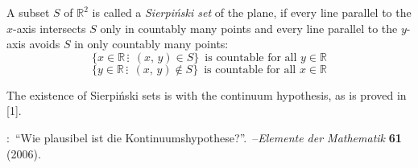 \documentclass[12pt]{article}
\theoremstyle{definition}
\begin{document}
A subset $S$ of $\mathbb{R}^2$ is called a \emph{Sierpi\'nski set} of the plane, if every line parallel to the $x$-axis intersects $S$ only in countably many points and every line parallel to the $y$-axis avoids $S$ in only countably many points:
$$\{x \in \mathbb{R}\,\vdots\;\, (x,\,y) \in S\} \,\mbox{ is countable for all }y \in \mathbb{R}$$
$$\{y \in \mathbb{R}\,\vdots\;\, (x,\,y) \notin S\} \,\mbox{ is countable for all }x \in \mathbb{R}$$

The existence of Sierpi\'nski sets is  with the continuum hypothesis, as is proved in [1].


\begin{thebibliography}{8}
:\, ``Wie plausibel ist die Kontinuumshypothese?''.\, --\emph{Elemente der Mathematik} \textbf{61} (2006).
\end{thebibliography}

\end{document}
